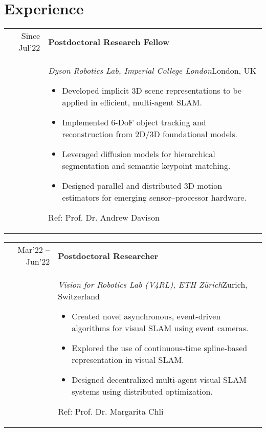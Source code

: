 \documentclass[11pt,a4paper,sans]{moderncv} %
\begin{document}
\vspace{-1.5cm}
\section{Experience}


\newlength{\colsep}
\setlength{\colsep}{0.0cm} %


\newcommand{\WorkExperience}[6]{%
	\noindent
	\begin{tabular*}{\textwidth}{@{\extracolsep{\fill}} r p{0.85\textwidth}}
		{\footnotesize #1} & \textbf{#4}\\
		& \textit{\small #2}\hfill{\footnotesize #3}%
		{\small 
			\begin{itemize}
				#5
			\end{itemize}{\footnotesize Ref: #6}}
	\end{tabular*}%
	\vspace{0.1cm}
}


\WorkExperience
	{Since Jul'22}
	{Dyson Robotics Lab, Imperial College London}
	{London, UK}
	{Postdoctoral Research Fellow}
	{
		\item Developed implicit 3D scene representations to be applied in efficient, multi-agent SLAM.
		\item Implemented 6-DoF object tracking and reconstruction from 2D/3D foundational models.
		\item Leveraged diffusion models for hierarchical segmentation and semantic keypoint matching.
		\item Designed parallel and distributed 3D motion estimators for emerging sensor–processor hardware.
	}
	{Prof. Dr. Andrew Davison}

\WorkExperience
{Mar'22 -- Jun'22}
{Vision for Robotics Lab (V4RL), ETH Z\"urich}
{Zurich, Switzerland}
{Postdoctoral Researcher}
{
		\item Created novel asynchronous, event-driven algorithms for visual SLAM using event cameras.
		\item Explored the use of continuous-time spline-based representation in visual SLAM.
		\item Designed decentralized multi-agent visual SLAM systems using distributed optimization.
	}
{Prof. Dr. Margarita Chli}
\end{document}
